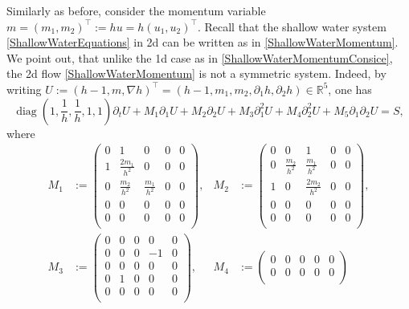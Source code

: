 \documentclass[reqno,11pt]{amsart}
\DeclareMathOperator{\diag}{diag}
\theoremstyle{plain}
\theoremstyle{definition}
\numberwithin{equation}{section}
\begin{document}
Similarly as before, consider the momentum variable $ m = (m_1,m_2)^\top:= hu = h(u_1,u_2)^\top $. Recall that the shallow water system \eqref{ShallowWaterEquations} in 2d can be written as in \eqref{ShallowWaterMomentum}. We point out, that unlike the 1d case as in \eqref{ShallowWaterMomentumConsice}, the 2d flow \eqref{ShallowWaterMomentum} is not a symmetric system. Indeed, by writing $ U:= (h -1, m, \nabla h)^\top = (h - 1, m_1, m_2, \partial_1 h, \partial_2 h) \in \mathbb R^5 $, one has
\begin{equation}
\label{ShallowWaterMomentum2D}
\diag\left(1,\frac{1}{h},\frac{1}{h},1,1\right) \partial_t U+M_1 \partial_1 U +M_2\partial_2 U +M_3\partial_1^2 U +M_4\partial_2^2 U +M_5\partial_{1}\partial_2 U=S,
\end{equation}
where
\begin{equation}
    \label{def:M-2d}
\begin{aligned}
M_1 & :=\begin{pmatrix}
    0 & 1 & 0 & 0 & 0 \\
    1 & \frac{2m_1}{h^2} & 0 & 0 & 0 \\
    0 & {\frac{m_2}{h^2}} & \frac{m_1}{h^2} & 0 & 0 \\
    0 & 0 & 0 & 0 & 0 \\
    0 & 0 & 0 & 0 & 0 \\
\end{pmatrix}, & M_2 &:=
\begin{pmatrix}
    0 & 0 & 1 & 0 & 0 \\
    0 & \frac{m_2}{h^2} & {\frac{m_1}{h^2}} & 0 & 0 \\
    1 & 0 & \frac{2m_2}{h^2} & 0 & 0 \\
    0 & 0 & 0 & 0 & 0 \\
    0 & 0 & 0 & 0 & 0 \\
\end{pmatrix}, \\
M_3& :=\begin{pmatrix}
    0 & 0 & 0 & 0 & 0 \\
    0 & 0 & 0 & -1 & 0 \\
    0 & 0 & 0 & 0 & 0 \\
    0 & 1 & 0 & 0 & 0 \\
    0 & 0 & 0 & 0 & 0 \\
\end{pmatrix},
&
M_4 &:=\begin{pmatrix}
    0 & 0 & 0 & 0 & 0 \\
    0 & 0 & 0 & 0 & 0 \\

\end{pmatrix}
\end{aligned}
\end{equation}
\end{document}
